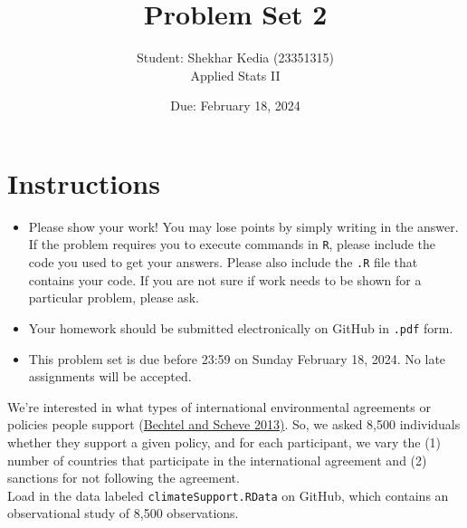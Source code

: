 \documentclass[12pt,letterpaper]{article}
\title{Problem Set 2}
\date{Due: February 18, 2024}
\author{Student: Shekhar Kedia (23351315)\\Applied Stats II}
\begin{document}
	\maketitle
	\section*{Instructions}
	\begin{itemize}
		\item Please show your work! You may lose points by simply writing in the answer. If the problem requires you to execute commands in \texttt{R}, please include the code you used to get your answers. Please also include the \texttt{.R} file that contains your code. If you are not sure if work needs to be shown for a particular problem, please ask.
		\item Your homework should be submitted electronically on GitHub in \texttt{.pdf} form.
		\item This problem set is due before 23:59 on Sunday February 18, 2024. No late assignments will be accepted.
	\end{itemize}

	
	

	\vspace{.25cm}
\noindent We're interested in what types of international environmental agreements or policies people support (\href{https://www.pnas.org/content/110/34/13763}{Bechtel and Scheve 2013)}. So, we asked 8,500 individuals whether they support a given policy, and for each participant, we vary the (1) number of countries that participate in the international agreement and (2) sanctions for not following the agreement. \\

\noindent Load in the data labeled \texttt{climateSupport.RData} on GitHub, which contains an observational study of 8,500 observations.
\end{document}
